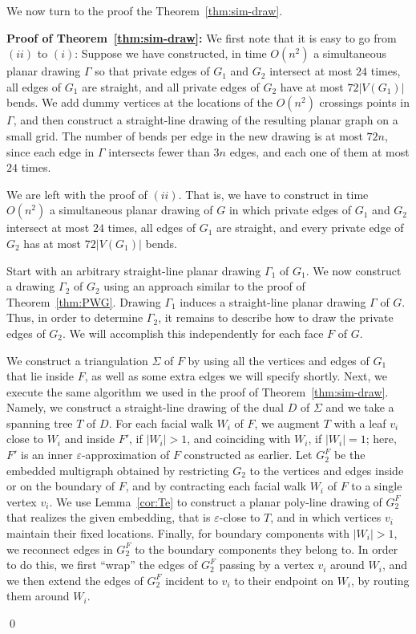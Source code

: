 \documentclass{llncs}
\newenvironment{proofof}[1]{\par\addvspace\topsep\noindent
{\bf Proof #1:} \ignorespaces }{\qed}
\begin{document}
We now turn to the proof the Theorem~\ref{thm:sim-draw}.


\begin{proofof}{of Theorem~\ref{thm:sim-draw}}
We first note that it is easy to go from $(ii)$ to $(i)$: Suppose
we have constructed, in time $O(n^2)$ a simultaneous planar drawing $\Gamma$ so that private edges of $G_1$ and $G_2$ intersect at most $24$ times, all edges of $G_1$ are straight, and all private edges of $G_2$ have at most $72 |V(G_1)|$ bends. We add dummy
vertices at the locations of the $O(n^2)$ crossings points in $\Gamma$, and then construct a straight-line drawing of the resulting planar graph on a small grid. The number of bends per edge in the new drawing is at most $72n$, since each edge in $\Gamma$ intersects fewer than $3n$ edges, and each one of them at most $24$ times.

We are left with the proof of $(ii)$. That is, we have to construct in time $O(n^2)$ a simultaneous planar drawing of $G$ in which private edges of $G_1$ and $G_2$ intersect at most $24$ times, all edges of $G_1$ are straight, and every private edge of $G_2$ has at most $72|V(G_1)|$ bends.

Start with an arbitrary straight-line planar drawing $\Gamma_1$ of $G_1$. We now construct a drawing $\Gamma_2$ of $G_2$ using an approach similar to the proof of Theorem~\ref{thm:PWG}. Drawing $\Gamma_1$ induces a straight-line planar drawing $\Gamma$ of $G$. Thus, in order to determine $\Gamma_2$, it remains to describe how to draw the private edges of $G_2$. We will accomplish this independently for each face $F$ of $G$.

We construct a triangulation $\Sigma$ of $F$ by using all the vertices and edges of $G_1$ that lie inside $F$, as well as some extra edges we will specify shortly. Next, we execute the same algorithm we used in the proof of Theorem~\ref{thm:sim-draw}.  Namely, we construct a straight-line drawing of the dual $D$ of $\Sigma$ and we take a spanning tree $T$ of $D$. For each facial walk $W_i$ of $F$, we augment $T$ with a leaf  $v_i$ close to $W_i$ and inside $F'$, if $|W_i| > 1$, and coinciding with $W_i$, if $|W_i| = 1$; here, $F'$ is an inner $\varepsilon$-approximation of $F$ constructed as earlier. Let $G^F_2$ be the embedded multigraph obtained by restricting $G_2$ to the vertices and edges inside or on the boundary of $F$, and by contracting each facial walk $W_i$ of $F$ to a single vertex $v_i$. We use Lemma~\ref{cor:Te} to construct a planar poly-line drawing of $G^F_2$ that realizes the given embedding, that is $\varepsilon$-close to $T$, and in which vertices $v_i$ maintain their fixed locations. Finally, for boundary components with $|W_i| > 1$, we reconnect edges in $G^F_2$ to the boundary components they belong to. In order to do this, we first ``wrap'' the edges of $G^F_2$ passing by a vertex $v_i$ around $W_i$, and we then extend the edges of $G^F_2$ incident to $v_i$ to their endpoint on $W_i$, by routing them around $W_i$.


\end{proofof}
\end{document}
